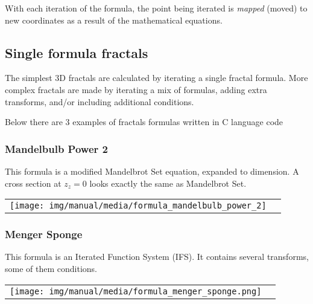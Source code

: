 With each iteration of the formula, the point being iterated is \emph{mapped} (moved) to new coordinates as a result of the mathematical equations.  

\subsection{Single formula fractals}\label{single-formula-fractals}

The simplest 3D fractals are calculated by iterating a single fractal formula. More complex fractals are made by iterating a mix of formulas, adding extra transforms, and/or including additional conditions. 

Below there are 3 examples of fractals formulas written in C language code

\subsubsection{Mandelbulb Power 2} \nopagebreak

This formula is a modified Mandelbrot Set equation, expanded to  dimension.
A cross section at $ z_z = 0 $ looks exactly the same as Mandelbrot Set.
\nopagebreak

\begin{tabular}{l l}
	\texttt{[image: img/manual/media/formula\_mandelbulb\_power\_2]}	
	& 
	\begin{minipage}[b]{0.5\linewidth}
		
	\end{minipage}
\end{tabular} 

\subsubsection{Menger Sponge} \nopagebreak

This formula is an Iterated Function System (IFS). It contains several
transforms, some of them conditions. \nopagebreak

\begin{tabular}{l l}
	\texttt{[image: img/manual/media/formula\_menger\_sponge.png]}	
	& 
	\begin{minipage}[b]{0.5\linewidth}
		
	\end{minipage}
\end{tabular} 

